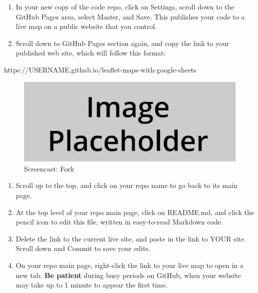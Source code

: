 \documentclass[
  english,
]{book}
\newenvironment{Shaded}{\begin{snugshade}}{\end{snugshade}}
\newcommand{\NormalTok}[1]{#1}
\begin{document}
\begin{enumerate}
\def\labelenumi{\arabic{enumi})}
\setcounter{enumi}{3}
\item
  In your new copy of the code repo, click on Settings, scroll down to the GitHub Pages area, select Master, and Save. This publishes your code to a live map on a public website that you control.
\item
  Scroll down to GitHub Pages section again, and copy the link to your published web site, which will follow this format:
\end{enumerate}

\begin{Shaded}
\begin{Highlighting}[]
\NormalTok{https://USERNAME.github.io/leaflet{-}maps{-}with{-}google{-}sheets}
\end{Highlighting}
\end{Shaded}

\begin{figure}
\centering
\includegraphics{images/placeholder.jpg}
\caption{\label{fig:lmwgs-1}Screencast: Fork}
\end{figure}

\begin{enumerate}
\def\labelenumi{\arabic{enumi})}
\setcounter{enumi}{5}
\item
  Scroll up to the top, and click on your repo name to go back to its main page.
\item
  At the top level of your repo main page, click on README.md, and click the pencil icon to edit this file, written in easy-to-read Markdown code.
\item
  Delete the link to the current live site, and paste in the link to YOUR site. Scroll down and Commit to save your edits.
\item
  On your repo main page, right-click the link to your live map to open in a new tab. \textbf{Be patient} during busy periods on GitHub, when your website may take up to 1 minute to appear the first time.
\end{enumerate}
\end{document}
